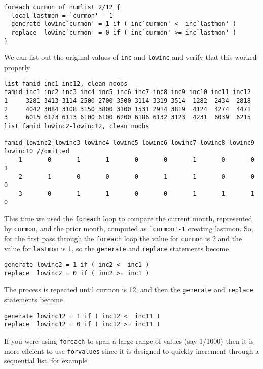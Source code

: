 \begin{lstlisting}
foreach curmon of numlist 2/12 {
  local lastmon = `curmon' - 1
  generate lowinc`curmon' = 1 if ( inc`curmon' <  inc`lastmon' )
  replace  lowinc`curmon' = 0 if ( inc`curmon' >= inc`lastmon' )
}
\end{lstlisting}

We can list out the original values of \lstinline{inc} and \lstinline{lowinc} and verify that this worked properly

\begin{lstlisting}
list famid inc1-inc12, clean noobs
famid inc1 inc2 inc3 inc4 inc5 inc6 inc7 inc8 inc9 inc10 inc11 inc12
1     3281 3413 3114 2500 2700 3500 3114 3319 3514  1282  2434  2818
2     4042 3084 3108 3150 3800 3100 1531 2914 3819  4124  4274  4471
3     6015 6123 6113 6100 6100 6200 6186 6132 3123  4231  6039  6215
list famid lowinc2-lowinc12, clean noobs

famid lowinc2 lowinc3 lowinc4 lowinc5 lowinc6 lowinc7 lowinc8 lowinc9 lowinc10 //omitted
    1       0       1       1       0       0       1       0       0        1
    2       1       0       0       0       1       1       0       0        0
    3       0       1       1       0       0       1       1       1        0
\end{lstlisting}

This time we used the \lstinline{foreach} loop to compare the current month, represented by \lstinline{curmon}, and the prior month, computed as \lstinline{`curmon'-1} creating lastmon.  So, for the first pass through the \lstinline{foreach} loop the value for \lstinline{curmon} is 2 and the value for \lstinline{lastmon} is 1, so the \lstinline{generate} and \lstinline{replace} statements become

\begin{lstlisting}
generate lowinc2 = 1 if ( inc2 <  inc1 )
replace  lowinc2 = 0 if ( inc2 >= inc1 )
\end{lstlisting}

The process is repeated until curmon is 12, and then the \lstinline{generate} and \lstinline{replace} statements become

\begin{lstlisting}
generate lowinc12 = 1 if ( inc12 <  inc11 )
replace  lowinc12 = 0 if ( inc12 >= inc11 )
\end{lstlisting}

If you were using \lstinline{foreach} to span a large range of values (say 1/1000) then it is more effcient to use \lstinline{forvalues} since it is designed to quickly increment through a sequential list, for example

